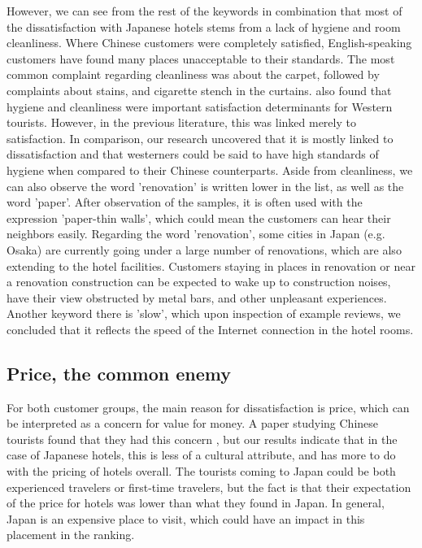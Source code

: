 However, we can see from the rest of the keywords in combination that most of the dissatisfaction with Japanese hotels stems from a lack of hygiene and room cleanliness. Where Chinese customers were completely satisfied, English-speaking customers have found many places unacceptable to their standards. The most common complaint regarding cleanliness was about the carpet, followed by complaints about stains, and cigarette stench in the curtains. \cite{kozak2002} also found that hygiene and cleanliness were important satisfaction determinants for Western tourists. However, in the previous literature, this was linked merely to satisfaction. In comparison, our research uncovered that it is mostly linked to dissatisfaction and that westerners could be said to have high standards of hygiene when compared to their Chinese counterparts. Aside from cleanliness, we can also observe the word 'renovation' is written lower in the list, as well as the word 'paper'. After observation of the samples, it is often used with the expression 'paper-thin walls', which could mean the customers can hear their neighbors easily. Regarding the word 'renovation', some cities in Japan (e.g. Osaka) are currently going under a large number of renovations, which are also extending to the hotel facilities. Customers staying in places in renovation or near a renovation construction can be expected to wake up to construction noises, have their view obstructed by metal bars, and other unpleasant experiences. Another keyword there is 'slow', which upon inspection of example reviews, we concluded that it reflects the speed of the Internet connection in the hotel rooms.

\subsection{Price, the common enemy}\label{disc:price}

For both customer groups, the main reason for dissatisfaction is price, which can be interpreted as a concern for value for money. A paper studying Chinese tourists found that they had this concern \cite[][]{truong2009}, but our results indicate that in the case of Japanese hotels, this is less of a cultural attribute, and has more to do with the pricing of hotels overall. The tourists coming to Japan could be both experienced travelers or first-time travelers, but the fact is that their expectation of the price for hotels was lower than what they found in Japan. In general, Japan is an expensive place to visit, which could have an impact in this placement in the ranking. 

